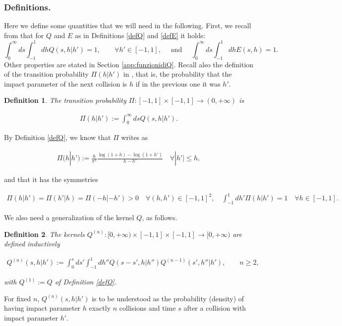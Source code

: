 \documentclass[a4paper,10pt,reqno]{amsart}
\newtheorem{definition}{Definition}[section]
\numberwithin{equation}{subsection}
\numberwithin{figure}{subsection}
\begin{document}
\subsubsection{Definitions.} Here we define some quantities that we will need in the following.
First, we recall from \cite{CG2008,MS2008d2,BU2009} that for $Q$ and $E$ as in Definitions \ref{defQ} and \ref{defE} it holds:
\[
\int_0^{\infty}ds\int_{-1}^1dhQ(s,h|h')=1,\qquad\forall h'\in[-1,1],\quad\textrm{ and }\quad\int_0^{\infty}ds\int_{-1}^1dhE(s,h)=1.
\]
Other properties are stated in Section \ref{app:funzionidiQ}. Recall also the definition of the transition probability $\Pi(h|h')$ in \cite{CG2010}, that is, the probability that the impact parameter of the next collision is $h$ if in the previous one it was $h'$.
\begin{definition}\label{def:Pi} The transition probability $\Pi:[-1,1]\times[-1,1]\to(0,+\infty)$ is

\begin{align*}
\Pi(h|h'):=\int_0^{\infty}dsQ(s,h|h').
\end{align*}

\end{definition}
By Definition \ref{defQ}, we know that $\Pi$ writes as

\begin{align*}
\Pi(h|h'):=\frac{6}{\pi^2}\frac{\log(1+h)-\log(1+h')}{h-h'}\quad\forall|h'|\leq h,
\end{align*}

and that it has the symmetries

{\footnotesize\begin{align*}
\Pi(h|h')=\Pi(h'|h)=\Pi(-h|-h')>0\quad\forall (h,h')\in[-1,1]^2,\quad\int_{-1}^1dh'\Pi(h|h')=1\quad\forall h\in[-1,1].
\end{align*}}

We also need a generalization of the kernel $Q$, as follows.
\begin{definition}\label{def:Qn} The kernels $Q^{(n)}:[0,+\infty)\times[-1,1]\times[-1,1]\to[0,+\infty)$ are defined inductively

\begin{align*}
Q^{(n)}(s,h|h'):=\int_0^sds'\int_{-1}^1dh''Q(s-s',h|h'')Q^{(n-1)}(s',h''|h'),\qquad n\geq2,
\end{align*}

with $Q^{(1)}:=Q$ of Definition \ref{defQ}.
\end{definition}
For fixed $n$, $Q^{(n)}(s,h|h')$ is to be understood as the probability (density) of having impact parameter $h$ exactly $n$ collisions and time $s$ after a collision with impact parameter $h'$.
\end{document}
